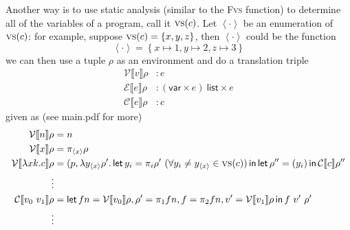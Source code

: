 \documentclass[11pt,a4paper]{article}
\newcommand {\coo} [1] {\ensuremath{\operatorname{\mathsf{#1}}}}
\newcommand{\Let}[1]{\coo{let} #1 \coo{in} }
\newcommand{\Rec}[1]{\left\{#1\right\}}
\newcommand{\ba}[1]{\left\langle #1\right\rangle}
\newcommand{\f}[1]{\textsc{#1}}
\newcommand{\g}[1]{\textsf{#1}}
\newcommand{\trans}[2]{\ensuremath{\mathcal{#1}\llbracket #2\rrbracket}}
\begin{document}
\begin{enumerate}[label=\textbf{Excercise \arabic*\ }]
\begin{enumerate}
Another way is to use static analysis (similar to the \f{Fvs} function) to determine all of the variables of a program, call it $\f{vs}(c)$. Let $\ba{\cdot}$ be an enumeration of $\f{vs}(c)$: for example, suppose $\f{vs}(c) = \Rec{x,y,z}$, then $\ba{\cdot}$ could be the function
$$
\ba{\cdot} = \Rec{x \mapsto 1, y \mapsto 2, z \mapsto 3}
$$
we can then use a tuple $\rho$ as an environment and do a translation triple
\begin{align*}
\trans{V}{v} \rho &: e \\
\trans{E}{e} \rho &: (\g{var}\times e)~\g{list} \times e \\
\trans{C}{e} \rho &: c
\end{align*}
given as (see main.pdf for more)
\begin{align*}
\trans{V}{n}\rho &= n \\
\trans{V}{x}\rho &= \pi_{\ba{x}}\rho \\
\trans{V}{\lambda xk.c} \rho &= (p, \lambda y_{\ba{x}}\rho'. \Let{y_i = \pi_i \rho' ~ (\forall y_i \ne y_{\ba{x}} \in \f{vs}(c))}{\Let{\rho'' = (y_i)}{\trans{C}{c}\rho''}} \\
\vdots \\
\trans{C}{v_0~v_1}\rho &= \Let{fn = \trans{V}{v_0}\rho, \rho' = \pi_1 fn, f = \pi_2 fn, v' = \trans{V}{v_1}\rho}{f~v'~\rho'} \\
\vdots
\end{align*}


\end{enumerate}
\end{enumerate}
\end{document}
